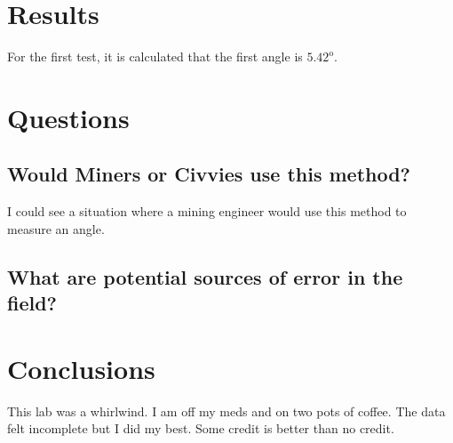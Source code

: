 \documentclass[hidelinks, 12pt, letterpaper]{article}
\begin{document}
\section{Results}

For the first test, it is calculated that the first angle is $5.42^{\text{o}}$.


\section{Questions}
\subsection{Would Miners or Civvies use this method?}
I could see a situation where a mining engineer would use this method to measure an angle.

\subsection{What are potential sources of error in the field?}


\section{Conclusions}
This lab was a whirlwind. I am off my meds and on two pots of coffee. The data felt incomplete 
but I did my best. Some credit is better than no credit.
\end{document}
